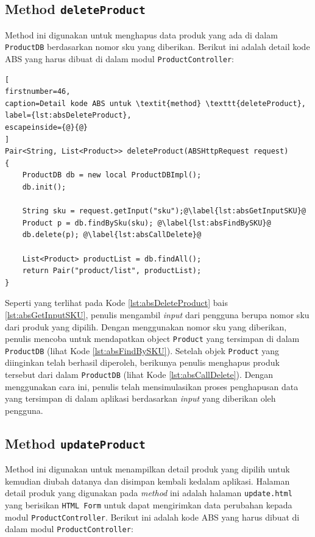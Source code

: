 \subsection{Method \texttt{deleteProduct}}
Method ini digunakan untuk menghapus data produk yang ada di dalam \texttt{ProductDB} berdasarkan nomor sku yang diberikan. Berikut ini adalah detail kode ABS yang harus dibuat di dalam modul \texttt{ProductController}:

\begin{lstlisting}[
firstnumber=46,
caption=Detail kode ABS untuk \textit{method} \texttt{deleteProduct},
label={lst:absDeleteProduct},
escapeinside={@}{@}
]
Pair<String, List<Product>> deleteProduct(ABSHttpRequest request)
{
	ProductDB db = new local ProductDBImpl();
	db.init();
	
	String sku = request.getInput("sku");@\label{lst:absGetInputSKU}@
	Product p = db.findBySku(sku); @\label{lst:absFindBySKU}@
	db.delete(p); @\label{lst:absCallDelete}@
	
	List<Product> productList = db.findAll();
	return Pair("product/list", productList);
}
\end{lstlisting}

Seperti yang terlihat pada Kode \ref{lst:absDeleteProduct} bais \ref{lst:absGetInputSKU}, penulis mengambil \textit{input} dari pengguna berupa nomor sku dari produk yang dipilih. Dengan menggunakan nomor sku yang diberikan, penulis mencoba untuk mendapatkan object \texttt{Product} yang tersimpan di dalam \texttt{ProductDB} (lihat Kode \ref{lst:absFindBySKU}). Setelah objek \texttt{Product} yang diinginkan telah berhasil diperoleh, berikunya penulis menghapus produk tersebut dari dalam \texttt{ProductDB} (lihat Kode \ref{lst:absCallDelete}). Dengan menggunakan cara ini, penulis telah mensimulasikan proses penghapusan data yang tersimpan di dalam aplikasi berdasarkan \textit{input} yang diberikan oleh pengguna.
 
\subsection{Method \texttt{updateProduct}}

Method ini digunakan untuk menampilkan detail produk yang dipilih untuk kemudian diubah datanya dan disimpan kembali kedalam aplikasi. Halaman detail produk yang digunakan pada \textit{method} ini adalah halaman \texttt{update.html} yang berisikan \texttt{HTML Form} untuk dapat mengirimkan data perubahan kepada modul \texttt{ProductController}. Berikut ini adalah kode ABS yang harus dibuat di dalam modul \texttt{ProductController}:

